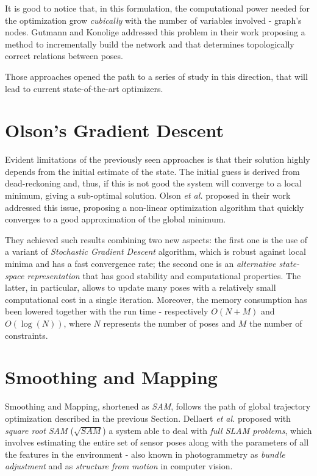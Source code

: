 It is good to notice that, in this formulation, the computational power needed for the optimization grow \textit{cubically} with the number of variables involved - graph's nodes. Gutmann and Konolige addressed this problem in their work \cite{gutmann1999incremental} proposing a method to incrementally build the network and that determines topologically correct relations between poses.

Those approaches opened the path to a series of study in this direction, that will lead to current state-of-the-art optimizers.

\section{Olson's Gradient Descent}
Evident limitations of the previously seen approaches is that their solution highly depends from the initial estimate of the state. The initial guess is derived from dead-reckoning and, thus, if this is not good the system will converge to a local minimum, giving a sub-optimal solution. Olson \textit{et al.} proposed in their work \cite{olson2006fast} addressed this issue, proposing a non-linear optimization algorithm that quickly converges to a good approximation of the global minimum. 

They achieved such results combining two new aspects: the first one is the use of a variant of \textit{Stochastic Gradient Descent} algorithm, which is robust against local minima and has a fast convergence rate; the second one is an \textit{alternative state-space representation} that has good stability and computational properties. The latter, in particular, allows to update many poses with a relatively small computational cost in a single iteration. Moreover, the memory consumption has been lowered together with the run time - respectively $O(N + M)$ and $O(\log(N))$, where $N$ represents the number of poses and $M$ the number of constraints.

\section{Smoothing and Mapping}
Smoothing and Mapping, shortened as \textit{SAM}, follows the path of global trajectory optimization described in the previous Section. Dellaert \textit{et al.} proposed with \textit{square root SAM} ($\sqrt{SAM}$) \cite{dellaert2006square} a system able to deal with \textit{full SLAM problems}, which involves estimating the entire set of sensor poses along with the parameters of all the features in the environment - also known in photogrammetry as \textit{bundle adjustment} and as \textit{structure from motion} in computer vision.


